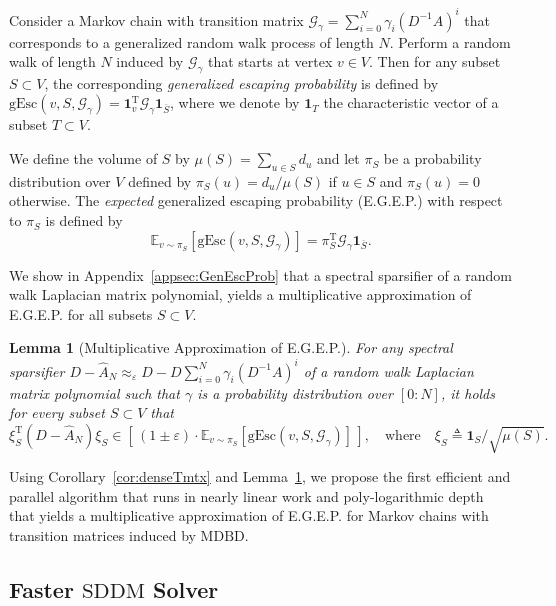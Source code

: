 \documentclass[11pt]{article}
\newcommand{\SDDM}{\mathrm{SDDM}}
\newcommand{\MDBD}{\mathrm{MDBD}}
\newcommand{\mGg}{\mathcal{G}_{\gamma}}
\newcommand{\hA}{\widehat{A}}
\newcommand{\Di}{D^{-1}}
\newcommand{\rot}{\mathrm{T}}
\newcommand{\eps}{\epsilon}
\renewcommand{\eps}{\varepsilon}
\newtheorem{lem}[thm]{Lemma}
\numberwithin{thm}{section}
\newcommand{\mat}[1]{\boldsymbol{\mathbf{#1}}}
\begin{document}
Consider a Markov chain with transition matrix $\mGg=\sum_{i=0}^{N}\gamma_{i}(\Di A)^i$ that corresponds to a generalized random walk process of length $N$. Perform a random walk of length $N$ induced by $\mGg$ that starts at vertex $v\in V$. Then for any subset $S\subset V$, the corresponding \emph{generalized escaping probability} is defined by $\mathrm{gEsc}(v,S,\mGg)=\mat{1}_{v}^{\rot}\mGg\mat{1}_{\overline{S}}$, where we denote by $\mat{1}_{T}$ the characteristic vector of a subset $T\subset V$.

We define the volume of $S$ by $\mu(S)=\sum_{u\in S}d_u$ and let $\pi_S$ be a probability distribution over $V$ defined by $\pi_{S}(u)=d_u/\mu(S)$ if $u\in S$ and $\pi_{S}(u)=0$ otherwise. The \emph{expected} generalized escaping probability (E.G.E.P.) with respect to $\pi_S$ is defined by
\begin{equation}\label{eq:ExpGEP}
\mathbb{E}_{v\sim\pi_S}[\mathrm{gEsc}(v,S,\mGg)]=\pi_{S}^{\rot}\mGg\mat{1}_{\overline{S}}.
\end{equation}

We show in Appendix~\ref{appsec:GenEscProb} that a spectral sparsifier of a random walk Laplacian matrix polynomial, yields a multiplicative approximation of E.G.E.P. for all subsets $S\subset V$.

\begin{lem}[Multiplicative Approximation of E.G.E.P.]\label{lem_mulApproxEGEP}
For any spectral sparsifier $D-\hA_{N} \approx_{\eps} D-D\sum_{i=0}^{N}\gamma_{i}(\Di A)^i$ of a random walk Laplacian matrix polynomial such that $\gamma$ is a probability distribution over $[0:N]$, it holds for every subset $S\subset V$ that
\[
\xi_{S}^{\rot}(D-\hA_N)\xi_{S}\in[\,(1\pm\eps)\cdot\mathbb{E}_{v\sim\pi_S}[\mathrm{gEsc}(v,S,\mGg)]\,],\quad \text{where}\quad\xi_S\triangleq\mat{1}_{S}/\sqrt{\mu(S)}.
\]
\end{lem}

Using Corollary~\ref{cor:denseTmtx} and Lemma~\ref{lem_mulApproxEGEP}, we propose the first efficient and parallel algorithm that runs in nearly linear work and poly-logarithmic depth that yields a multiplicative approximation of E.G.E.P. for Markov chains with transition matrices induced by $\MDBD$.



\subsection{Faster $\SDDM$ Solver}\label{subsec:FSSMS}
\end{document}
